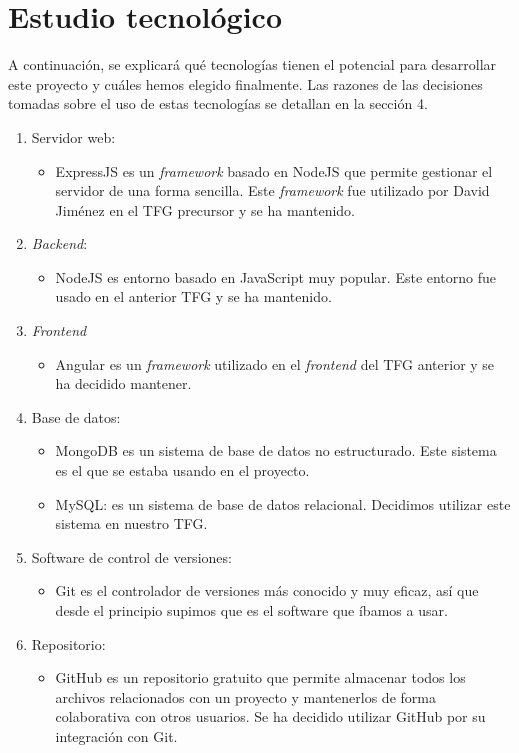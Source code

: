 \documentclass[11pt]{book}
\begin{document}
	\section{Estudio tecnológico}
	A continuación, se explicará qué tecnologías tienen el potencial para desarrollar este proyecto y cuáles hemos elegido finalmente. Las razones de las decisiones tomadas sobre el uso de estas tecnologías se detallan en la sección 4.
	\begin{enumerate} 
		\item Servidor web:
		\begin{itemize} 
			\item ExpressJS es un \textit{framework} basado en NodeJS que permite gestionar el servidor de una forma sencilla. Este \textit{framework} fue utilizado por David Jiménez en el TFG precursor y se ha mantenido.
		\end{itemize}
		\item \emph{Backend}: 
		\begin{itemize} 
			\item NodeJS es entorno basado en JavaScript muy popular. Este entorno fue usado en el anterior TFG y se ha mantenido.
		\end{itemize}
		\item \emph{Frontend}
		\begin{itemize} 
			\item Angular es un \textit{framework} utilizado en el \textit{frontend} del TFG anterior y se ha decidido mantener.
		\end{itemize}
		\item Base de datos: 
		\begin{itemize} 
			\item MongoDB es un sistema de base de datos no estructurado. Este sistema es el que se estaba usando en el proyecto.
			\item MySQL: es un sistema de base de datos relacional. Decidimos utilizar este sistema en nuestro TFG.
		\end{itemize}
		\item Software de control de versiones:
		\begin{itemize} 
			\item Git es el controlador de versiones más conocido y muy eficaz, así que desde el principio supimos que es el software que íbamos a usar. 
		\end{itemize}
		\item Repositorio: 
		\begin{itemize} 
			\item GitHub es un repositorio gratuito que permite almacenar todos los archivos relacionados con un proyecto y mantenerlos de forma colaborativa con otros usuarios. Se ha decidido utilizar GitHub por su integración con Git.

\end{itemize}
\end{enumerate}
\end{document}

